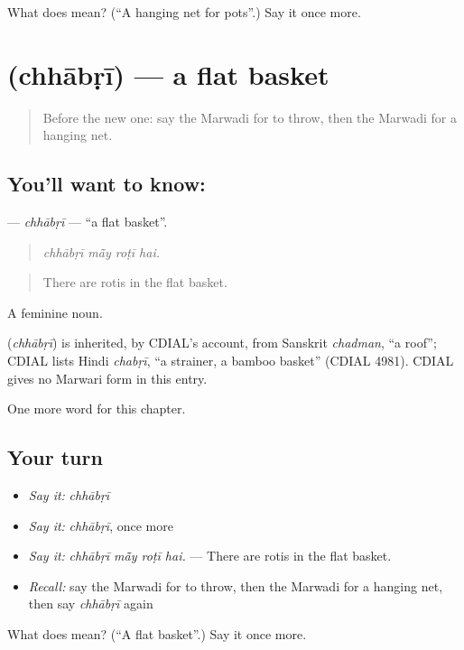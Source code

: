 \begin{tcolorbox}[breakable,colback=teal!4,colframe=teal!35!black,title={Before you move on}]
What does  mean? (\textquotedblleft{}A hanging net for pots\textquotedblright{}.) Say it once more.
\end{tcolorbox}
\section[\texorpdfstring{\mw{छाबड़ी} (chhābṛī)}{छाबड़ी (chhābṛī)}]{ (chhābṛī) — a flat basket}

\label{lesson:MW-C180-chhabri}



\begin{quote}
Before the new one: say the Marwadi for to throw, then the Marwadi for a hanging net.
\end{quote}

\subsection*{You'll want to know: }
\textbf{} — \emph{chhābṛī} — \textquotedblleft{}a flat basket\textquotedblright{}.

\begin{quote}
   
\end{quote}

\begin{quote}
\emph{chhābṛī mā̃y roṭī hai.}
\end{quote}

\begin{quote}
There are rotis in the flat basket.
\end{quote}

A feminine noun.

\begin{cousinweb}
\textbf{} (\emph{chhābṛī}) is inherited, by CDIAL's account, from Sanskrit \emph{chadman}, \textquotedblleft{}a roof\textquotedblright{}; CDIAL lists Hindi \emph{chabṛī}, \textquotedblleft{}a strainer, a bamboo basket\textquotedblright{} (CDIAL 4981). CDIAL gives no Marwari form in this entry.
\end{cousinweb}

\begin{grammarlens}[title={What you've built}]
One more word for this chapter.
\end{grammarlens}

\subsection*{Your turn}
\begin{itemize}
\raggedright
  \item \emph{Say it:} \emph{chhābṛī}
  \item \emph{Say it:} \emph{chhābṛī}, once more
  \item \emph{Say it:} \emph{chhābṛī mā̃y roṭī hai.} — There are rotis in the flat basket.
  \item \emph{Recall:} say the Marwadi for to throw, then the Marwadi for a hanging net, then say \emph{chhābṛī} again
\end{itemize}

\begin{tcolorbox}[breakable,colback=teal!4,colframe=teal!35!black,title={Before you move on}]
What does  mean? (\textquotedblleft{}A flat basket\textquotedblright{}.) Say it once more.
\end{tcolorbox}
